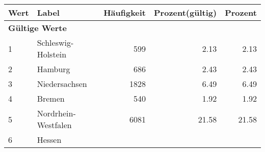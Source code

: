      \begin{longtable}{lXrrr}
     \toprule
     \textbf{Wert} & \textbf{Label} & \textbf{Häufigkeit} & \textbf{Prozent(gültig)} & \textbf{Prozent} \\
     \endhead
     \midrule
     \multicolumn{5}{l}{\textbf{Gültige Werte}}\\

     1 &
     \multicolumn{1}{X}{ Schleswig-Holstein   } &


       \num{599} &
       \num[round-mode=places,round-precision=2]{2,13} &
         \num[round-mode=places,round-precision=2]{2,13} \\

     2 &
     \multicolumn{1}{X}{ Hamburg   } &


       \num{686} &
       \num[round-mode=places,round-precision=2]{2,43} &
         \num[round-mode=places,round-precision=2]{2,43} \\

     3 &
     \multicolumn{1}{X}{ Niedersachsen   } &


       \num{1828} &
       \num[round-mode=places,round-precision=2]{6,49} &
         \num[round-mode=places,round-precision=2]{6,49} \\

     4 &
     \multicolumn{1}{X}{ Bremen   } &


       \num{540} &
       \num[round-mode=places,round-precision=2]{1,92} &
         \num[round-mode=places,round-precision=2]{1,92} \\

     5 &
     \multicolumn{1}{X}{ Nordrhein-Westfalen   } &


       \num{6081} &
       \num[round-mode=places,round-precision=2]{21,58} &
         \num[round-mode=places,round-precision=2]{21,58} \\

     6 &
     \multicolumn{1}{X}{ Hessen   } &



\end{longtable}
